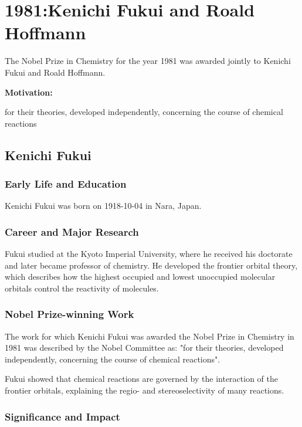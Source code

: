 \chapter{1981:Kenichi Fukui and Roald Hoffmann}

\label{chap:chemistry1981}

The Nobel Prize in Chemistry for the year 1981 was awarded jointly to Kenichi Fukui and Roald Hoffmann.

\textbf{Motivation:}

for their theories, developed independently, concerning the course of chemical reactions

\section{Kenichi Fukui}

\subsection*{Early Life and Education}

Kenichi Fukui was born on 1918-10-04 in Nara, Japan.

\subsection*{Career and Major Research}

Fukui studied at the Kyoto Imperial University, where he received his doctorate and later became professor of chemistry. He developed the frontier orbital theory, which describes how the highest occupied and lowest unoccupied molecular orbitals control the reactivity of molecules.

\subsection*{Nobel Prize-winning Work}

The work for which Kenichi Fukui was awarded the Nobel Prize in Chemistry in 1981 was described by the Nobel Committee as: "for their theories, developed independently, concerning the course of chemical reactions".

Fukui showed that chemical reactions are governed by the interaction of the frontier orbitals, explaining the regio- and stereoselectivity of many reactions.

\subsection*{Significance and Impact}

